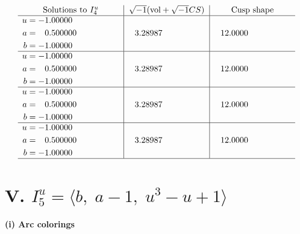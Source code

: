 \documentclass[1p]{elsarticle_modified}
\theoremstyle{definition}
\newcommand{\I}{\sqrt{-1}}
\begin{document}
$$\begin{array}{c|c|c}  
\text{Solutions to }I^u_{4}& \I (\text{vol} + \sqrt{-1}CS) & \text{Cusp shape}\\
 \hline 
\begin{aligned}
u &= -1.00000\phantom{ +0.000000I} \\
a &= \phantom{-}0.500000\phantom{ +0.000000I} \\
b &= -1.00000\phantom{ +0.000000I}\end{aligned}
 & \phantom{-}3.28987\phantom{ +0.000000I} & \phantom{-}12.0000\phantom{ +0.000000I} \\ \hline\begin{aligned}
u &= -1.00000\phantom{ +0.000000I} \\
a &= \phantom{-}0.500000\phantom{ +0.000000I} \\
b &= -1.00000\phantom{ +0.000000I}\end{aligned}
 & \phantom{-}3.28987\phantom{ +0.000000I} & \phantom{-}12.0000\phantom{ +0.000000I} \\ \hline\begin{aligned}
u &= -1.00000\phantom{ +0.000000I} \\
a &= \phantom{-}0.500000\phantom{ +0.000000I} \\
b &= -1.00000\phantom{ +0.000000I}\end{aligned}
 & \phantom{-}3.28987\phantom{ +0.000000I} & \phantom{-}12.0000\phantom{ +0.000000I} \\ \hline\begin{aligned}
u &= -1.00000\phantom{ +0.000000I} \\
a &= \phantom{-}0.500000\phantom{ +0.000000I} \\
b &= -1.00000\phantom{ +0.000000I}\end{aligned}
 & \phantom{-}3.28987\phantom{ +0.000000I} & \phantom{-}12.0000\phantom{ +0.000000I}\\
 \hline 
 \end{array}$$\newpage\newpage\renewcommand{\arraystretch}{1}
\centering \section*{V. $I^u_{5}= \langle b,\;a-1,\;u^3- u+1 \rangle$}
\flushleft \textbf{(i) Arc colorings}\\
\end{document}
